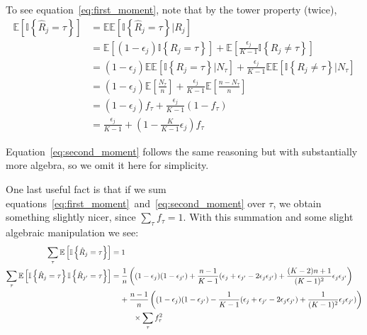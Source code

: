 \documentclass[a4paper,fontsize=9pt,DIV=14]{scrartcl}
\begin{document}
To see equation~\eqref{eq:first_moment}, note that by the tower property (twice),
\begin{align*}
\mathbb{E}\left[\mathbb{I}\left\{\hat{R}_j = \tau\right\}\right] &= \mathbb{E}\mathbb{E}\left[\mathbb{I}\left\{\hat{R}_j = \tau\right\} | R_j\right]\\
&= \mathbb{E}\left[(1-\epsilon_j) \mathbb{I}\left\{R_j = \tau \right\}\right] + \mathbb{E}\left[\frac{\epsilon_j}{K-1}\mathbb{I}\left\{R_j \ne \tau \right\}\right]\\
&= (1-\epsilon_j)\mathbb{E}\mathbb{E}\left[\mathbb{I}\left\{R_j = \tau \right\} | N_\tau \right] + \frac{\epsilon_j}{K-1}\mathbb{E}\mathbb{E}\left[\mathbb{I}\left\{R_j \ne \tau \right\} | N_\tau \right]\\
&= (1-\epsilon_j) \mathbb{E}\left[\frac{N_\tau}{n}\right] + \frac{\epsilon_j}{K-1}\mathbb{E}\left[\frac{n-N_\tau}{n}\right]\\
&= (1-\epsilon_j) f_\tau + \frac{\epsilon_j}{K-1}(1- f_\tau)\\
&= \frac{\epsilon_j}{K-1} + \left(1 - \frac{K}{K-1}\epsilon_j\right)f_\tau
\end{align*}

Equation~\eqref{eq:second_moment} follows the same reasoning but with substantially more algebra, so we omit it here for simplicity.

One last useful fact is that if we sum equations~\eqref{eq:first_moment}~and~\eqref{eq:second_moment} over $\tau$, we obtain something slightly nicer, since $\sum_\tau f_\tau =1$.  With this summation and some slight algebraic manipulation we see:
\begin{align}
\sum_{\tau}\mathbb{E}\left[\mathbb{I}\left\{\hat{R}_j = \tau\right\}\right] &= 1 \label{eq:first_moment_sum}\\
\sum_{\tau}\mathbb{E}\left[\mathbb{I}\left\{\hat{R}_j = \tau\right\}\mathbb{I}\left\{\hat{R}_{j'} = \tau\right\}\right] &= \frac{1}{n}\left((1-\epsilon_j)(1-\epsilon_{j'}) + \frac{n-1}{K-1}(\epsilon_j + \epsilon_{j'} - 2\epsilon_j\epsilon_{j'}) + \frac{(K-2)n + 1}{(K-1)^2}\epsilon_j\epsilon_{j'}\right)  \label{eq:second_moment_sum} \\&\hspace{0.4cm}+ \frac{n-1}{n}\left((1-\epsilon_j)(1-\epsilon_{j'}) - \frac{1}{K-1}(\epsilon_j + \epsilon_{j'} - 2\epsilon_j\epsilon_{j'}) + \frac{1}{(K-1)^2}\epsilon_j\epsilon_{j'})\right)  \nonumber \\ &\hspace{1cm}\times \sum_\tau f_\tau^2 \nonumber
\end{align}
\end{document}
